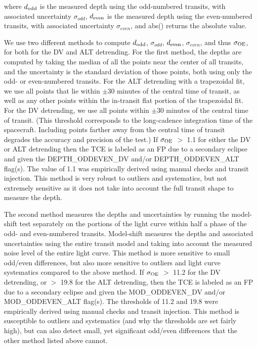 \noindent where $d_{\rm odd}$ is the measured depth using the odd-numbered transits, with associated uncertainty $\sigma_{odd}$, $d_{\rm even}$ is the measured depth using the even-numbered transits, with associated uncertainty $\sigma_{even}$, and abs() returns the absolute value.

We use two different methods to compute $d_{\rm odd}$, $\sigma_{odd}$, $d_{\rm even}$, $\sigma_{even}$, and thus $\sigma_{\rm OE}$, for both for the DV and ALT detrending. For the first method, the depths are computed by taking the median of all the points near the center of all transits, and the uncertainty is the standard deviation of those points, both using only the odd- or even-numbered transits. For the ALT detrending with a trapezoidal fit, we use all points that lie within $\pm$30 minutes of the central time of transit, as well as any other points within the in-transit flat portion of the trapezoidal fit. For the DV detrending, we use all points within $\pm$30 minutes of the central time of transit. (This threshold corresponds to the long-cadence integration time of the \kepler{} spacecraft. Including points farther away from the central time of transit degrades the accuracy and precision of the test.) If $\sigma_{\rm OE}$ $>$ 1.1 for either the DV or ALT detrending then the TCE is labeled as an FP due to a secondary eclipse and given the DEPTH\_ODDEVEN\_DV and/or DEPTH\_ODDEVEN\_ALT flag(s). The value of 1.1 was empirically derived using manual checks and transit injection. This method is very robust to outliers and systematics, but not extremely sensitive as it does not take into account the full transit shape to measure the depth.

The second method measures the depths and uncertainties by running the model-shift test separately on the portions of the light curve within half a phase of the odd- and even-numbered transits. Model-shift measures the depths and associated uncertainties using the entire transit model and taking into account the measured noise level of the entire light curve. This method is more sensitive to small odd/even differences, but also more sensitive to outliers and light curve systematics compared to the above method. If $\sigma_{\rm OE}$ $>$ 11.2 for the DV detrending, or $>$ 19.8 for the ALT detrending, then the TCE is labeled as an FP due to a secondary eclipse and given the MOD\_ODDEVEN\_DV and/or MOD\_ODDEVEN\_ALT flag(s). The thresholds of 11.2 and 19.8 were empirically derived using manual checks and transit injection. This method is susceptible to outliers and systematics (and why the thresholds are set fairly high), but can also detect small, yet significant odd/even differences that the other method listed above cannot.



